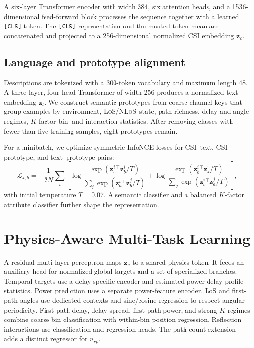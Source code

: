 \documentclass{article}
\newcommand{\los}{\textsc{LoS}}
\newcommand{\nlos}{\textsc{NLoS}}
\begin{document}
A six-layer Transformer encoder \citep{vaswani2017attention} with width 384, six attention heads, and a 1536-dimensional feed-forward block processes the sequence together with a learned \texttt{[CLS]} token.
The \texttt{[CLS]} representation and the masked token mean are concatenated and projected to a 256-dimensional normalized CSI embedding $\mathbf{z}_c$.

\subsection{Language and prototype alignment}

Descriptions are tokenized with a 300-token vocabulary and maximum length 48.
A three-layer, four-head Transformer of width 256 produces a normalized text embedding $\mathbf{z}_t$.
We construct semantic prototypes from coarse channel keys that group examples by environment, \los/\nlos\ state, path richness, delay and angle regimes, $K$-factor bin, and interaction statistics.
After removing classes with fewer than five training samples, eight prototypes remain.

For a minibatch, we optimize symmetric InfoNCE losses for CSI--text, CSI--prototype, and text--prototype pairs:
\begin{equation}
\mathcal{L}_{a,b} =
 -\frac{1}{2N}\sum_i
 \left[
 \log\frac{\exp(\mathbf{z}_a^i{}^\top\mathbf{z}_b^i/T)}
 {\sum_j\exp(\mathbf{z}_a^i{}^\top\mathbf{z}_b^j/T)}
 +
 \log\frac{\exp(\mathbf{z}_b^i{}^\top\mathbf{z}_a^i/T)}
 {\sum_j\exp(\mathbf{z}_b^i{}^\top\mathbf{z}_a^j/T)}
 \right],
\end{equation}
with initial temperature $T=0.07$.
A semantic classifier and a balanced $K$-factor attribute classifier further shape the representation.

\section{Physics-Aware Multi-Task Learning}
\label{sec:physics}

A residual multi-layer perceptron maps $\mathbf{z}_c$ to a shared physics token.
It feeds an auxiliary head for normalized global targets and a set of specialized branches.
Temporal targets use a delay-specific encoder and estimated power-delay-profile statistics.
Power prediction uses a separate power-feature encoder.
LoS and first-path angles use dedicated contexts and sine/cosine regression to respect angular periodicity.
First-path delay, delay spread, first-path power, and strong-$K$ regimes combine coarse bin classification with within-bin position regression.
Reflection interactions use classification and regression heads.
The path-count extension adds a distinct regressor for $n_{rp}$.
\end{document}
